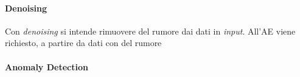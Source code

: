 \paragraph{Denoising}
Con \textit{denoising} si intende rimuovere del rumore dai dati in \textit{input}.
All'AE viene richiesto, a partire da dati con del rumore



\paragraph{Anomaly Detection}


\clearpage

\clearpage
